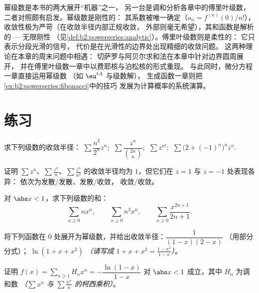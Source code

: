 \begin{remark}[本卷中的不同视角]
幂级数是本书的两大展开“机器”之一，
另一台是调和分析各章中的傅里叶级数，
二者对照颇有启发。幂级数是刚性的：
其系数被唯一确定（$a_n = f^{(n)}(0)/n!$），
收敛性极为严苛（在收敛半径内部正规收敛，
外部则毫无希望），其和函数是解析的 --- 无限刚性
（见\cref{def:b2:powerseries:analytic}）。傅里叶级数则是柔性的：
它只表示分段光滑的信号，
代价是在光滑性的边界处出现精细的收敛问题。
这两种理论在本章的周末问题中相遇：
切萨罗与阿贝尔求和法在本章中针对边界圆周展开，
并在傅里叶级数一章中以费耶核与泊松核的形式重现。
与此同时，微分方程一章直接运用幂级数
（如 $\eu^{tA}$ 与级数解），
生成函数一章则把
\cref{ex:b2:powerseries:fibonacci}中的技巧
发展为计算概率的系统演算。
\end{remark}

\section{练习}

\begin{exercise}[$\star$]\label{exo:b2:powerseries:1}
求下列级数的收敛半径：
$\sum \dfrac{n^2}{2^n}z^n$; $\;\sum \dfrac{z^n}{\binom{2n}{n}}$;
$\;\sum z^{n!}$; $\;\sum \bigl(2 + (-1)^n\bigr)^n z^n$.
\end{exercise}

\begin{exercise}[$\star$]\label{exo:b2:powerseries:2}
证明 $\sum z^n$、$\sum \frac{z^n}{n}$、$\sum \frac{z^n}{n^2}$
的收敛半径均为 $1$，但它们在 $z = 1$ 与 $z = -1$ 处表现各异：
依次为发散/发散、发散/收敛，
收敛/收敛。
\end{exercise}

\begin{exercise}[$\star$]\label{exo:b2:powerseries:3}
对 $\abs x < 1$，求下列级数的和：
\[
\sum_{n\geq0} n x^n,
\qquad
\sum_{n\geq0} n^2 x^n,
\qquad
\sum_{n\geq0} \frac{x^{2n+1}}{2n+1} .
\]
\end{exercise}

\begin{exercise}[$\star\star$]\label{exo:b2:powerseries:4}
将下列函数在 $0$ 处展开为幂级数，并给出收敛半径：$\dfrac{1}{(1-x)(2-x)}$
（用部分分式）；$\;\ln(1 + x + x^2)$ \emph{（请写成 $1 + x + x^2
= \frac{1 - x^3}{1 - x}$）}。
\end{exercise}

\begin{exercise}[$\star\star$]\label{exo:b2:powerseries:5}
证明 $f(x) = \sum_{n\geq1} H_n x^n = -\dfrac{\ln(1 -
x)}{1 - x}$ 对 $\abs x < 1$ 成立，其中 $H_n$ 为调和数
\emph{（$\sum x^n$ 与 $\sum \frac{x^n}{n}$ 的柯西乘积）}。
\end{exercise}


